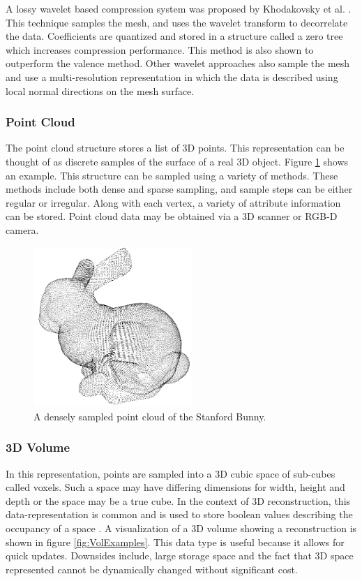 A lossy wavelet based compression system was proposed by Khodakovsky et al. \cite{Khodakovsky00Progressive}. This technique samples the mesh, and uses the wavelet transform to decorrelate the data. Coefficients are quantized and stored in a structure called a zero tree which increases compression performance. This method is also shown to outperform the valence method. Other wavelet approaches \cite{Guskov00Normal,Khodakovsky04Normalmesh} also sample the mesh and use a multi-resolution representation in which the data is described using local normal directions on the mesh surface. \\


\subsubsection{Point Cloud}

The point cloud structure stores a list of 3D points. This representation can be thought of as discrete samples of the surface of a real 3D object. Figure \ref{PointCloudExample} shows an example. This structure can be sampled using a variety of methods. These methods include both dense and sparse sampling, and sample steps can be either regular or irregular. Along with each vertex, a variety of attribute information can be stored. Point cloud data may be obtained via a 3D scanner or RGB-D camera. 

\begin{figure}[!htb]
\centering
\includegraphics[width=6cm]{images/ch2/PointCloudExample}
\caption{A densely sampled point cloud of the Stanford Bunny.}
\label{PointCloudExample}
\end{figure}


\subsubsection{3D Volume}

In this representation, points are sampled into a 3D cubic space of sub-cubes called voxels. Such a space may have differing dimensions for width, height and depth or the space may be a true cube. In the context of 3D reconstruction, this data-representation is common and is used to store boolean values describing the occupancy of a space \cite{Rusinkiewicz02Real}. A visualization of a 3D volume showing a reconstruction is shown in figure \ref{fig:VolExamples}. This data type is useful because it allows for quick updates. Downsides include, large storage space and the fact that 3D space represented cannot be dynamically changed without significant cost. \\


